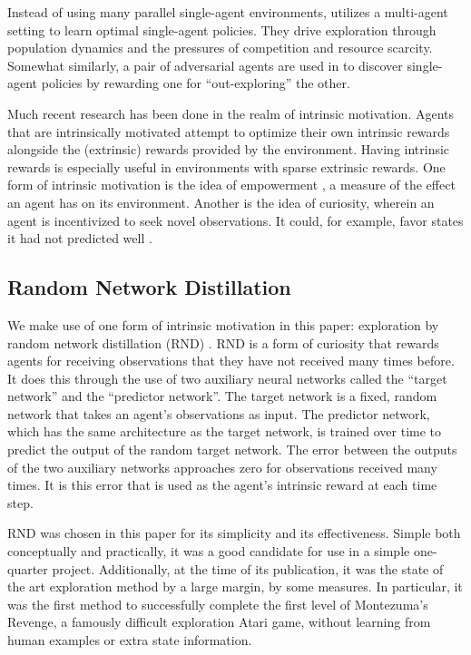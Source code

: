 \documentclass[12pt,journal,compsoc]{IEEEtran}
\begin{document}
	Instead of using many parallel single-agent environments, \cite{malthusian_rl} utilizes a multi-agent setting to learn optimal single-agent policies. They drive exploration through population dynamics and the pressures of competition and resource scarcity. Somewhat similarly, a pair of adversarial agents are used in \cite{asymmetric_selfplay} to discover single-agent policies by rewarding one for ``out-exploring'' the other. 
	
	Much recent research has been done in the realm of intrinsic motivation. Agents that are intrinsically motivated attempt to optimize their own intrinsic rewards alongside the (extrinsic) rewards provided by the environment. Having intrinsic rewards is especially useful in environments with sparse extrinsic rewards. One form of intrinsic motivation is the idea of empowerment \cite{empowerment}, a measure of the effect an agent has on its environment. Another is the idea of curiosity, wherein an agent is incentivized to seek novel observations. It could, for example, favor states it had not predicted well \cite{prediction_error}.
	
	\subsection{Random Network Distillation}
	We make use of one form of intrinsic motivation in this paper: exploration by random network distillation (RND) \cite{rnd}. RND is a form of curiosity that rewards agents for receiving observations that they have not received many times before. It does this through the use of two auxiliary neural networks called the ``target network'' and the ``predictor network''. The target network is a fixed, random network that takes an agent's observations as input. The predictor network, which has the same architecture as the target network, is trained over time to predict the output of the random target network. The error between the outputs of the two auxiliary networks approaches zero for observations received many times. It is this error that is used as the agent's intrinsic reward at each time step.
	
	RND was chosen in this paper for its simplicity and its effectiveness. Simple both conceptually and practically, it was a good candidate for use in a simple one-quarter project. Additionally, at the time of its publication, it was the state of the art exploration method by a large margin, by some measures. In particular, it was the first method to successfully complete the first level of Montezuma's Revenge, a famously difficult exploration Atari game, without learning from human examples or extra state information.
	
\end{document}
